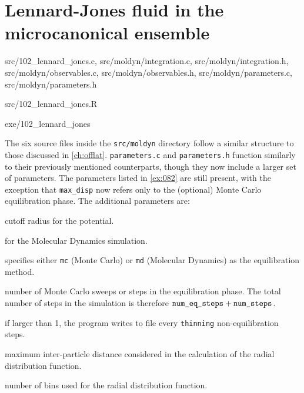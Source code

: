 \section{Lennard-Jones fluid in the microcanonical ensemble}

\begin{sourcefiles}
  \item[Source codes] src/102\_lennard\_jones.c, src/moldyn/integration.c,
    src/moldyn/integration.h, src/moldyn/observables.c,
    src/moldyn/observables.h, src/moldyn/parameters.c, src/moldyn/parameters.h
  \item[Analysis script] src/102\_lennard\_jones.R
  \item[Executable] exe/102\_lennard\_jones
\end{sourcefiles}

The six source files inside the \texttt{src/moldyn} directory follow a similar
structure to those discussed in \cref{ch:offlat}. \texttt{parameters.c} and
\texttt{parameters.h} function similarly to their previously mentioned
counterparts, though they now include a larger set of parameters. The parameters
listed in \cref{ex:082} are still present, with the exception that
\texttt{max\_disp} now refers only to the (optional) Monte Carlo equilibration
phase. The additional parameters are:
\begin{description}[font=\normalfont\ttfamily]
  \item[r\_cut] cutoff radius for the potential.
  \item[step\_size] for the Molecular Dynamics simulation.
  \item[eq\_type] specifies either \texttt{mc} (Monte Carlo) or \texttt{md}
    (Molecular Dynamics) as the equilibration method.
  \item[num\_eq\_steps] number of Monte Carlo sweeps or  steps in the
    equilibration phase. The total number of steps in the simulation is
    therefore $\text{\texttt{num\_eq\_steps}} + \text{\texttt{num\_steps}}$.
  \item[thinning] if larger than \num{1}, the program writes to file every
    \texttt{thinning} non-equilibration steps.
  \item[rdf\_max\_radius] maximum inter-particle distance considered in the
    calculation of the radial distribution function.
  \item[rdf\_num\_bins] number of bins used for the radial distribution
    function.
\end{description}

